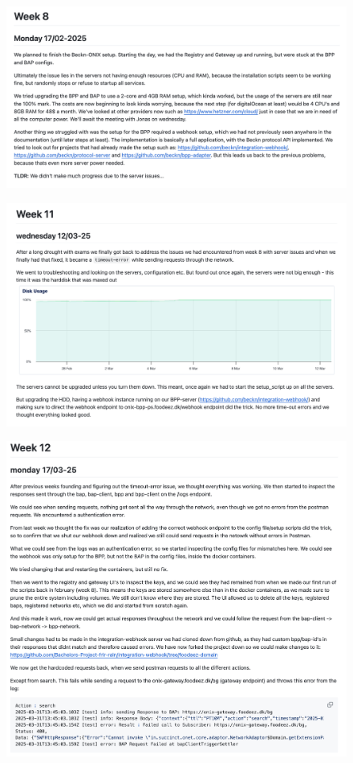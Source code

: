 \begin{figure}[H]
    \centering
    \includegraphics[width=\textwidth]{Images/week_08.png}
\end{figure}

\begin{figure}[H]
    \centering
    \includegraphics[width=\textwidth]{Images/week_11.png}
\end{figure}

\begin{figure}[H]
    \centering
    \includegraphics[width=\textwidth]{Images/week_12-13.png}
\end{figure}

